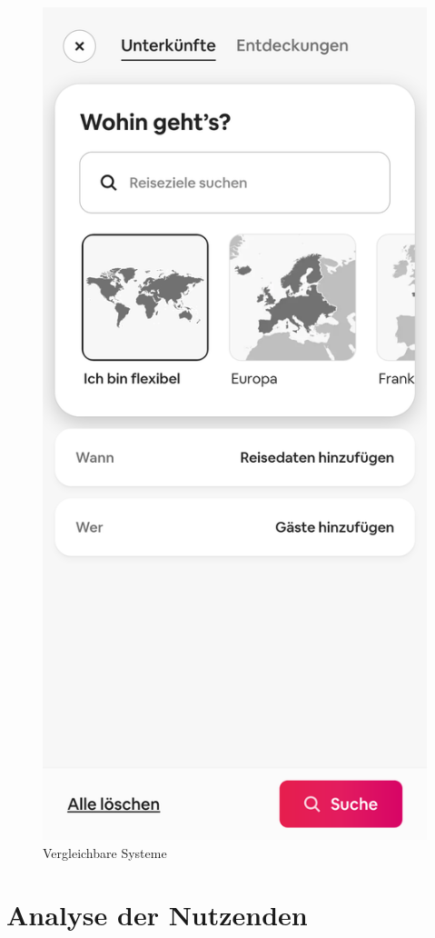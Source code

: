 \begin{figure}[h]
        \includegraphics[scale=0.1]{Bilder/Arbnbnsuche.png}
        \caption[Vergleichbare Systeme]{Vergleichbare Systeme}\label{fig:system}
\end{figure}
\section{Analyse der Nutzenden}

